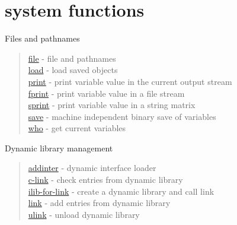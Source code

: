 \chapter*{system functions}

Files and pathnames
\begin{quote}
\noindent
\hyperlink{file}{file} - file and pathnames\\
\hyperlink{load}{load} - load saved objects\\
\hyperlink{print}{print} - print variable value  in the current output stream\\
\hyperlink{fprint}{fprint} - print variable value in a file stream\\
\hyperlink{sprint}{sprint} - print variable value in a string matrix \\
\hyperlink{save}{save} - machine independent binary save of variables\\
\hyperlink{who}{who} - get current variables\\
\end{quote}

Dynamic library management
\begin{quote}
\noindent 
\hyperlink{addinter}{addinter} - dynamic interface loader\\
\hyperlink{c_link}{c-link} - check entries from dynamic library \\
\hyperlink{ilib_for_link}{ilib-for-link} - create a dynamic library and call link \\
\hyperlink{link}{link} - add entries from dynamic library \\
\hyperlink{ulink}{ulink} - unload dynamic library \\
\end{quote}



  
  

 
 
 
 
